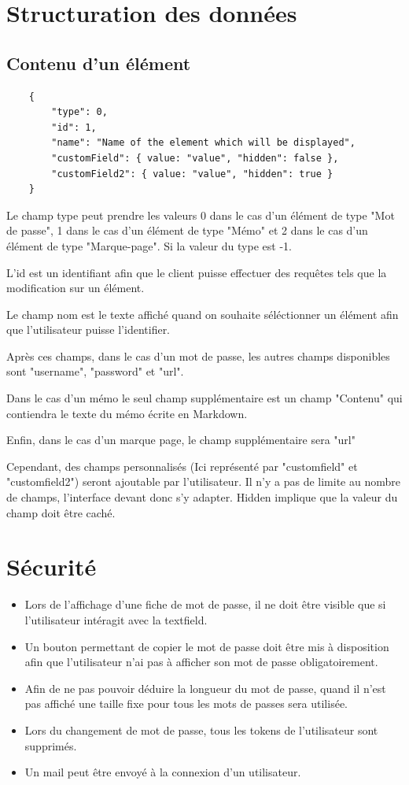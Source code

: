 \documentclass[oneside]{report}
\begin{document}
	\section{Structuration des données}{
		\subsection{Contenu d'un élément} {
			\vspace{.5cm}
			\begin{lstlisting}
	{
		"type": 0,
		"id": 1,
		"name": "Name of the element which will be displayed",
		"customField": { value: "value", "hidden": false },
		"customField2": { value: "value", "hidden": true }
	}
			\end{lstlisting}
			\vspace{1cm}
			\par Le champ type peut prendre les valeurs 0 dans le cas d'un élément de type "Mot de passe", 1 dans le cas d'un élément de type "Mémo" et 2 dans le cas d'un élément de type "Marque-page". Si la valeur du type est -1.
			\par L'id est un identifiant afin que le client puisse effectuer des requêtes tels que la modification sur un élément.
			\par Le champ nom est le texte affiché quand on souhaite séléctionner un élément afin que l'utilisateur puisse l'identifier.
			\par Après ces champs, dans le cas d'un mot de passe, les autres champs disponibles sont "username", "password" et "url".
			\par Dans le cas d'un mémo le seul champ supplémentaire est un champ "Contenu" qui contiendra le texte du mémo écrite en Markdown.
			\par Enfin, dans le cas d'un marque page, le champ supplémentaire sera "url"
			\par Cependant, des champs personnalisés (Ici représenté par "customfield" et "customfield2") seront ajoutable par l'utilisateur. Il n'y a pas de limite au nombre de champs, l'interface devant donc s'y adapter. Hidden implique que la valeur du champ doit être caché.
		}
	}
	\section{Sécurité}{
		\begin{itemize}
			\item Lors de l'affichage d'une fiche de mot de passe, il ne doit être visible que si l'utilisateur intéragit avec la textfield.
			\item Un bouton permettant de copier le mot de passe doit être mis à disposition afin que l'utilisateur n'ai pas à afficher son mot de passe obligatoirement.
			\item Afin de ne pas pouvoir déduire la longueur du mot de passe, quand il n'est pas affiché une taille fixe pour tous les mots de passes sera utilisée.
			\item Lors du changement de mot de passe, tous les tokens de l'utilisateur sont supprimés.
			\item Un mail peut être envoyé à la connexion d'un utilisateur.
		\end{itemize}
	}
\end{document}
